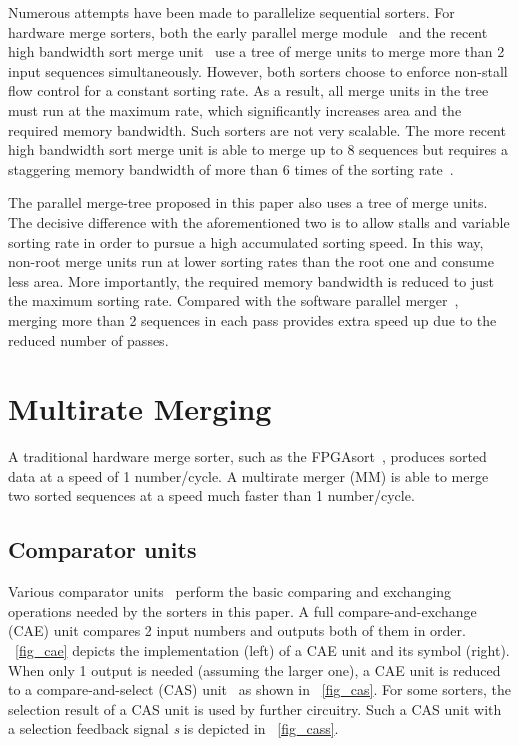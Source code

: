 \documentclass[10pt, conference]{IEEEtran}
\begin{document}
Numerous attempts have been made to parallelize sequential sorters.
For hardware merge sorters, both the early parallel merge module~\cite{Liu1989} and the recent high bandwidth sort merge unit~\cite{Casper2014}
use a tree of merge units to merge more than 2 input sequences simultaneously.
However, both sorters choose to enforce non-stall flow control for a constant sorting rate.
As a result, all merge units in the tree must run at the maximum rate,
which significantly increases area and the required memory bandwidth.
Such sorters are not very scalable.
The more recent high bandwidth sort merge unit is able to merge up to 8 sequences
but requires a staggering memory bandwidth of more than 6 times of the sorting rate~\cite{Casper2014}.


The parallel merge-tree proposed in this paper also uses a tree of merge units.
The decisive difference with the aforementioned two is to allow stalls and variable sorting rate in order to pursue a high accumulated sorting speed.
In this way, non-root merge units run at lower sorting rates than the root one and consume less area.
More importantly, the required memory bandwidth is reduced to just the maximum sorting rate.
Compared with the software parallel merger~\cite{Odeh2012}, merging more than 2 sequences in each pass provides extra speed up due to the reduced number of passes. 

\section{Multirate Merging}

A traditional hardware merge sorter, such as the FPGAsort~\cite{Koch2011}, produces sorted data at a speed of 1 number/cycle.
A multirate merger (MM) is able to merge two sorted sequences at a speed much faster than 1 number/cycle.

\subsection{Comparator units}

Various comparator units~\cite{Farmahini-Farahani2013} perform the basic comparing and exchanging operations needed by the sorters in this paper.
A full compare-and-exchange (CAE) unit compares 2 input numbers and outputs both of them in order.
\figurename~\ref{fig_cae} depicts the implementation (left) of a CAE unit and its symbol (right).
When only 1 output is needed (assuming the larger one),
a CAE unit is reduced to a compare-and-select (CAS) unit~\cite{Farmahini-Farahani2013} as shown in \figurename~\ref{fig_cas}.
For some sorters, the selection result of a CAS unit is used by further circuitry.
Such a CAS unit with a selection feedback signal \emph{s} is depicted in \figurename~\ref{fig_cass}.
\end{document}
